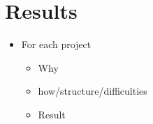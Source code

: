 \newpage
\section{Results}


\begin{itemize}
  \item For each project
  \begin{itemize}
    \item Why
    \item how/structure/difficulties
    \item Result
  \end{itemize}
\end{itemize}
